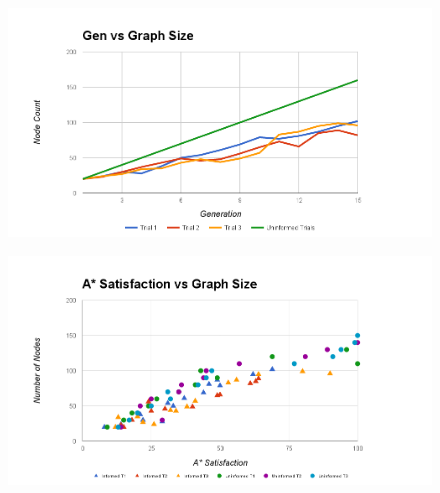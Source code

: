 	\begin{figure}
		\includegraphics[width=1.2\columnwidth]{tests/gengraphsize}
		\caption{}
	\end{figure}
	
	\begin{figure}
		\includegraphics[width=1.2\columnwidth]{tests/satgraphsize}
		\caption{}
	\end{figure}
	